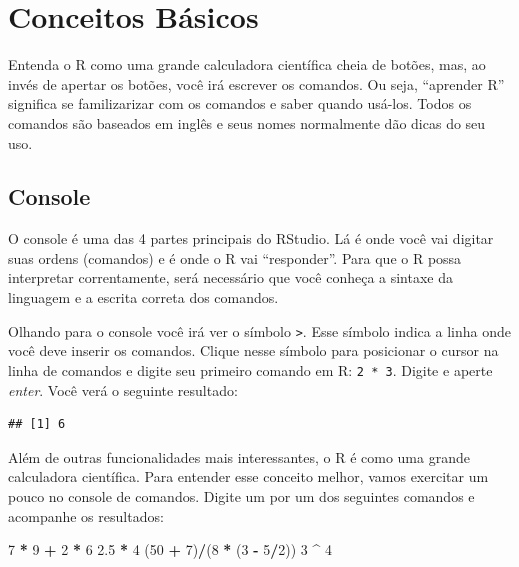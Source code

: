 \documentclass[]{book}
\newenvironment{Shaded}{\begin{snugshade}}{\end{snugshade}}
\newcommand{\DecValTok}[1]{\textcolor[rgb]{0.00,0.00,0.81}{#1}}
\newcommand{\FloatTok}[1]{\textcolor[rgb]{0.00,0.00,0.81}{#1}}
\newcommand{\StringTok}[1]{\textcolor[rgb]{0.31,0.60,0.02}{#1}}
\newcommand{\OperatorTok}[1]{\textcolor[rgb]{0.81,0.36,0.00}{\textbf{#1}}}
\newcommand{\NormalTok}[1]{#1}
\begin{document}
\chapter{Conceitos Básicos}\label{conceitos-basicos}

Entenda o R como uma grande calculadora científica cheia de botões, mas,
ao invés de apertar os botões, você irá escrever os comandos. Ou seja,
``aprender R'' significa se familizarizar com os comandos e saber quando
usá-los. Todos os comandos são baseados em inglês e seus nomes
normalmente dão dicas do seu uso.

\section{Console}\label{console}

O console é uma das 4 partes principais do RStudio. Lá é onde você vai
digitar suas ordens (comandos) e é onde o R vai ``responder''. Para que
o R possa interpretar correntamente, será necessário que você conheça a
sintaxe da linguagem e a escrita correta dos comandos.

Olhando para o console você irá ver o símbolo \texttt{\textgreater{}}.
Esse símbolo indica a linha onde você deve inserir os comandos. Clique
nesse símbolo para posicionar o cursor na linha de comandos e digite seu
primeiro comando em R: \texttt{2\ *\ 3}. Digite e aperte \emph{enter}.
Você verá o seguinte resultado:

\begin{verbatim}
## [1] 6
\end{verbatim}

Além de outras funcionalidades mais interessantes, o R é como uma grande
calculadora científica. Para entender esse conceito melhor, vamos
exercitar um pouco no console de comandos. Digite um por um dos
seguintes comandos e acompanhe os resultados:

\begin{Shaded}
\begin{Highlighting}[]
\DecValTok{7} \OperatorTok{*}\StringTok{ }\DecValTok{9} \OperatorTok{+}\StringTok{ }\DecValTok{2} \OperatorTok{*}\StringTok{ }\DecValTok{6}
\FloatTok{2.5} \OperatorTok{*}\StringTok{ }\DecValTok{4}
\NormalTok{(}\DecValTok{50} \OperatorTok{+}\StringTok{ }\DecValTok{7}\NormalTok{)}\OperatorTok{/}\NormalTok{(}\DecValTok{8} \OperatorTok{*}\StringTok{ }\NormalTok{(}\DecValTok{3} \OperatorTok{-}\StringTok{ }\DecValTok{5}\OperatorTok{/}\DecValTok{2}\NormalTok{))}
\DecValTok{3} \OperatorTok{^}\StringTok{ }\DecValTok{4}
\end{Highlighting}
\end{Shaded}
\end{document}
